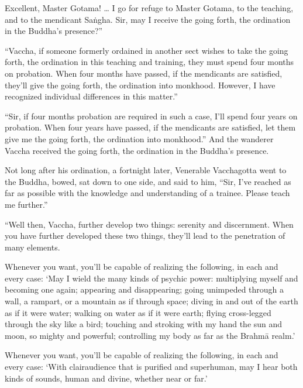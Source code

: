 \documentclass[12pt,openany]{book}%
\begin{document}
Excellent, Master Gotama! … I go for refuge to Master Gotama, to the teaching, and to the mendicant \textsanskrit{Saṅgha}. Sir, may I receive the going forth, the ordination in the Buddha’s presence?” 

“Vaccha, if someone formerly ordained in another sect wishes to take the going forth, the ordination in this teaching and training, they must spend four months on probation. When four months have passed, if the mendicants are satisfied, they’ll give the going forth, the ordination into monkhood. However, I have recognized individual differences in this matter.” 

“Sir, if four months probation are required in such a case, I’ll spend four years on probation. When four years have passed, if the mendicants are satisfied, let them give me the going forth, the ordination into monkhood.” And the wanderer Vaccha received the going forth, the ordination in the Buddha’s presence. 

Not long after his ordination, a fortnight later, Venerable Vacchagotta went to the Buddha, bowed, sat down to one side, and said to him, “Sir, I’ve reached as far as possible with the knowledge and understanding of a trainee. Please teach me further.” 

“Well then, Vaccha, further develop two things: serenity and discernment. When you have further developed these two things, they’ll lead to the penetration of many elements. 

Whenever you want, you’ll be capable of realizing the following, in each and every case: ‘May I wield the many kinds of psychic power: multiplying myself and becoming one again; appearing and disappearing; going unimpeded through a wall, a rampart, or a mountain as if through space; diving in and out of the earth as if it were water; walking on water as if it were earth; flying cross-legged through the sky like a bird; touching and stroking with my hand the sun and moon, so mighty and powerful; controlling my body as far as the \textsanskrit{Brahmā} realm.’ 

Whenever you want, you’ll be capable of realizing the following, in each and every case: ‘With clairaudience that is purified and superhuman, may I hear both kinds of sounds, human and divine, whether near or far.’ 
\end{document}
